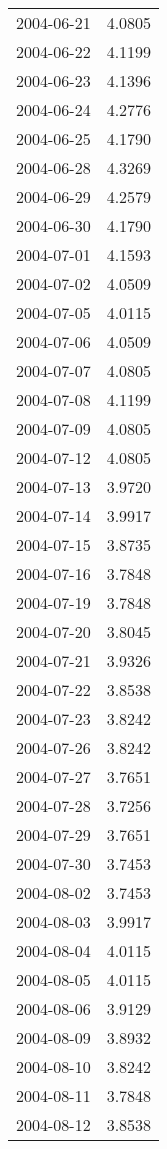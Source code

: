 \begin{tabular}{lr}
2004-06-21 &      4.0805 \\
2004-06-22 &      4.1199 \\
2004-06-23 &      4.1396 \\
2004-06-24 &      4.2776 \\
2004-06-25 &      4.1790 \\
2004-06-28 &      4.3269 \\
2004-06-29 &      4.2579 \\
2004-06-30 &      4.1790 \\
2004-07-01 &      4.1593 \\
2004-07-02 &      4.0509 \\
2004-07-05 &      4.0115 \\
2004-07-06 &      4.0509 \\
2004-07-07 &      4.0805 \\
2004-07-08 &      4.1199 \\
2004-07-09 &      4.0805 \\
2004-07-12 &      4.0805 \\
2004-07-13 &      3.9720 \\
2004-07-14 &      3.9917 \\
2004-07-15 &      3.8735 \\
2004-07-16 &      3.7848 \\
2004-07-19 &      3.7848 \\
2004-07-20 &      3.8045 \\
2004-07-21 &      3.9326 \\
2004-07-22 &      3.8538 \\
2004-07-23 &      3.8242 \\
2004-07-26 &      3.8242 \\
2004-07-27 &      3.7651 \\
2004-07-28 &      3.7256 \\
2004-07-29 &      3.7651 \\
2004-07-30 &      3.7453 \\
2004-08-02 &      3.7453 \\
2004-08-03 &      3.9917 \\
2004-08-04 &      4.0115 \\
2004-08-05 &      4.0115 \\
2004-08-06 &      3.9129 \\
2004-08-09 &      3.8932 \\
2004-08-10 &      3.8242 \\
2004-08-11 &      3.7848 \\
2004-08-12 &      3.8538 \\

\end{tabular}
